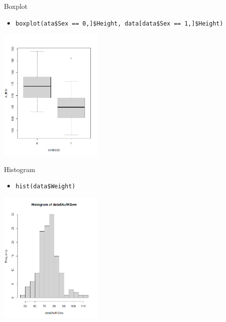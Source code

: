 \documentclass[aspectratio = 169]{chariteBeamer}
\begin{document}
\begin{frame}[fragile]{Boxplot}
	\begin{itemize}
		\item \verb+boxplot(ata$Sex == 0,]$Height, data[data$Sex == 1,]$Height)+
	\end{itemize}
			
	\begin{center}
		\includegraphics[height=6.5cm]{Boxplot}
	\end{center}
\end{frame}

\begin{frame}[fragile]{Histogram}
	\begin{itemize}
		\item \verb+hist(data$Weight)+
	\end{itemize}
			
	\begin{center}
		\includegraphics[height=6.5cm]{Histogram}
	\end{center}
\end{frame}
\end{document}

